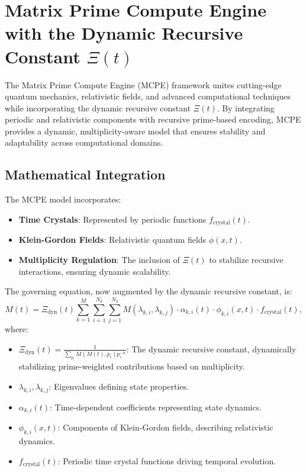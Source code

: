 \documentclass{article}
\theoremstyle{plain}
\begin{document}
\section{Matrix Prime Compute Engine with the Dynamic Recursive Constant \(\Xi(t) \)}

The Matrix Prime Compute Engine (MCPE) framework unites cutting-edge quantum mechanics, relativistic fields, and advanced computational techniques while incorporating the dynamic recursive constant \(\Xi(t) \). By integrating periodic and relativistic components with recursive prime-based encoding, MCPE provides a dynamic, multiplicity-aware model that ensures stability and adaptability across computational domains.

\subsection{Mathematical Integration}
The MCPE model incorporates:
\begin{itemize}
    \item \textbf{Time Crystals}: Represented by periodic functions \( f_{\text{crystal}}(t) \).
    \item \textbf{Klein-Gordon Fields}: Relativistic quantum fields \( \phi(x, t) \).
    \item \textbf{Multiplicity Regulation}: The inclusion of \(\Xi(t) \) to stabilize recursive interactions, ensuring dynamic scalability.
\end{itemize}
The governing equation, now augmented by the dynamic recursive constant, is:
\begin{equation}
M(t) = \Xi_{\text{dyn}}(t) \sum_{k=1}^M \sum_{i=1}^{N_k} \sum_{j=1}^{N_k} M(\lambda_{k,i}, \lambda_{k,j}) \cdot \alpha_{k,i}(t) \cdot \phi_{k,i}(x,t) \cdot f_{\text{crystal}}(t),
\end{equation}
where:
\begin{itemize}
    \item \( \Xi_{\text{dyn}}(t) = \frac{1}{\sum_{p_i} M(M(t), p_i) p_i^{-\alpha}} \): The dynamic recursive constant, dynamically stabilizing prime-weighted contributions based on multiplicity.
    \item \( \lambda_{k,i}, \lambda_{k,j} \): Eigenvalues defining state properties.
    \item \( \alpha_{k,i}(t) \): Time-dependent coefficients representing state dynamics.
    \item \( \phi_{k,i}(x,t) \): Components of Klein-Gordon fields, describing relativistic dynamics.
    \item \( f_{\text{crystal}}(t) \): Periodic time crystal functions driving temporal evolution.
\end{itemize}
\end{document}
